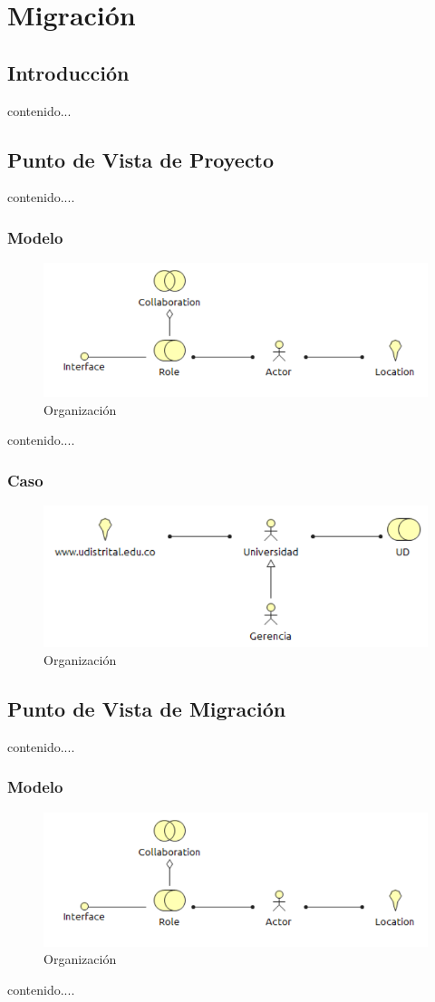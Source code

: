 \chapter{Migración}
\section{Introducción}
contenido...
\newpage
\section{Punto de Vista de Proyecto}
contenido....
\subsection{Modelo}
\begin{figure}[th!]
	\centering
	\includegraphics[width=0.8\linewidth]{arquitectura_diseno/imgs/M_Organizacion}
	\caption{Organización}
\end{figure}
\newpage
contenido....
\subsection{Caso}
\begin{figure}[th!]
	\centering
	\includegraphics[width=0.8\linewidth]{arquitectura_diseno/imgs/C_Organizacion}
	\caption{Organización}
\end{figure}
\newpage
\section{Punto de Vista de Migración}
contenido....
\subsection{Modelo}
\begin{figure}[th!]
	\centering
	\includegraphics[width=0.8\linewidth]{arquitectura_diseno/imgs/M_Organizacion}
	\caption{Organización}
\end{figure}
\newpage
contenido....
